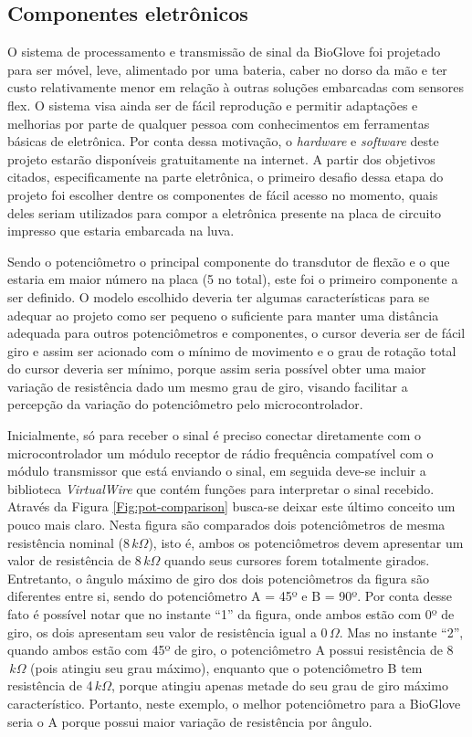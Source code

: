 \documentclass[
	12pt,				%
	openright,			%
	oneside,			%
	a4paper,			%
	english,			%
	brazil				%
	]{abntex2}
\begin{document}
			
			\subsection{Componentes eletrônicos}	

			O sistema de processamento e transmissão de sinal da BioGlove foi projetado para ser móvel, leve, alimentado por uma bateria, caber no dorso da mão e ter custo relativamente menor em relação à outras soluções embarcadas com sensores flex. O sistema visa ainda ser de fácil reprodução e permitir adaptações e melhorias por parte de qualquer pessoa com conhecimentos em ferramentas básicas de eletrônica. Por conta dessa motivação, o \textit{hardware} e \textit{software} deste projeto estarão disponíveis gratuitamente na internet. A partir dos objetivos citados, especificamente na parte eletrônica, o primeiro desafio dessa etapa do projeto foi escolher dentre os componentes de fácil acesso no momento, quais deles seriam utilizados para compor a eletrônica presente na placa de circuito impresso que estaria embarcada na luva.
			
			Sendo o potenciômetro o principal componente do transdutor de flexão e o que estaria em maior número na placa (5 no total), este foi o primeiro componente a ser definido. O modelo escolhido deveria ter algumas características para se adequar ao projeto como ser pequeno o suficiente para manter uma distância adequada para outros potenciômetros e componentes, o cursor deveria ser de fácil giro e assim ser acionado com o mínimo de movimento e o grau de rotação total do cursor deveria ser mínimo, porque assim seria possível obter uma maior variação de resistência dado um mesmo grau de giro, visando facilitar a percepção da variação do potenciômetro pelo microcontrolador. 
			
		Inicialmente, só para receber o sinal é preciso conectar diretamente com o microcontrolador um módulo receptor de rádio frequência compatível com o módulo transmissor que está enviando o sinal, em seguida deve-se incluir a biblioteca \textit{VirtualWire} que contém funções para interpretar o sinal recebido. 
			Através da Figura \ref{Fig:pot-comparison} busca-se deixar este último conceito um pouco mais claro. Nesta figura são comparados dois potenciômetros de mesma resistência nominal (8$\,k\Omega$), isto é, ambos os potenciômetros devem apresentar um valor de resistência de 8$\,k\Omega$ quando seus cursores forem totalmente girados. Entretanto, o ângulo máximo de giro dos dois potenciômetros da figura são diferentes entre si, sendo do potenciômetro A = 45º e B = 90º. Por conta desse fato é possível notar que no instante ``1'' da figura, onde ambos estão com 0º de giro, os dois apresentam seu valor de resistência igual a 0$\,\Omega$. Mas no instante ``2'', quando ambos estão com 45º de giro, o potenciômetro A possui resistência de 8$\,k\Omega$ (pois atingiu seu grau máximo), enquanto que o potenciômetro B tem resistência de 4$\,k\Omega$, porque atingiu apenas metade do seu grau de giro máximo característico. Portanto, neste exemplo, o melhor potenciômetro para a BioGlove seria o A porque possui maior variação de resistência por ângulo.
\end{document}
